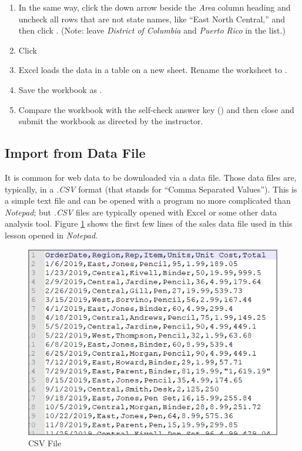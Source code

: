 \begin{enumbox}
\begin{enumerate}
		\item In the same way, click the down arrow beside the \textit{Area} column heading and uncheck all rows that are not state names, like ``East North Central,'' and then click . (Note: leave \textit{District of Columbia} and \textit{Puerto Rico} in the list.)
		\item Click 
		\item Excel loads the data in a table on a new sheet. Rename the worksheet to .
		\item Save the workbook as .
		\item Compare the workbook with the self-check answer key () and then close and submit the  workbook as directed by the instructor.
	\end{enumerate}
\end{enumbox}

\subsection{Import from Data File}\label{07:ImportFromDataFile}

It is common for web data to be downloaded via a data file. Those data files are, typically, in a \textit{.CSV} format (that stands for ``Comma Separated Values''). This is a simple text file and can be opened with a program no more complicated than \textit{Notepad}; but \textit{.CSV} files are typically opened with Excel or some other data analysis tool. Figure \ref{07:fig04} shows the first few lines of the sales data file used in this lesson opened in \textit{Notepad}.

\begin{figure}[H]
	\centering
	\includegraphics[width=\maxwidth{.95\linewidth}]{gfx/ch07_fig04}
	\caption{CSV File}
	\label{07:fig04}
\end{figure}

